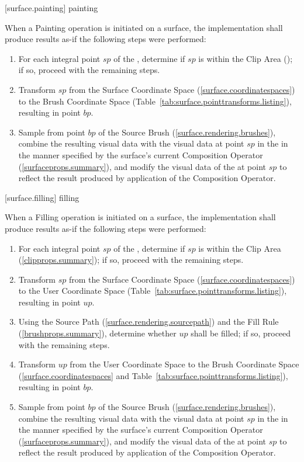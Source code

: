  [surface.painting] { painting}

\pnum
When a Painting operation is initiated on a surface, the implementation shall produce results as-if the following steps were performed:

\begin{enumerate}
\item For each integral point $sp$ of the \underlyingsurface, determine if $sp$ is within the Clip Area (); if so, proceed with the remaining steps.
\item Transform $sp$ from the Surface Coordinate Space (\ref{surface.coordinatespaces}) to the Brush Coordinate Space (Table~\ref{tab:surface.pointtransforms.listing}), resulting in point $bp$.
\item Sample from point $bp$ of the Source Brush (\ref{surface.rendering.brushes}), combine the resulting visual data with the visual data at point $sp$ in the \underlyingsurface in the manner specified by the surface's current Composition Operator (\ref{surfaceprops.summary}), and modify the visual data of the \underlyingsurface at point $sp$ to reflect the result produced by application of the Composition Operator.
\end{enumerate}

 [surface.filling] { filling}

\pnum
When a Filling operation is initiated on a surface, the implementation shall produce results as-if the following steps were performed:

\begin{enumerate}
\item For each integral point $sp$ of the \underlyingsurface, determine if $sp$ is within the Clip Area (\ref{clipprops.summary}); if so, proceed with the remaining steps.
\item Transform $sp$ from the Surface Coordinate Space (\ref{surface.coordinatespaces}) to the User Coordinate Space (Table~\ref{tab:surface.pointtransforms.listing}), resulting in point $up$.
\item Using the Source Path (\ref{surface.rendering.sourcepath}) and the Fill Rule (\ref{brushprops.summary}), determine whether $up$ shall be filled; if so, proceed with the remaining steps.
\item Transform $up$ from the User Coordinate Space to the Brush Coordinate Space (\ref{surface.coordinatespaces} and Table~\ref{tab:surface.pointtransforms.listing}), resulting in point $bp$.
\item Sample from point $bp$ of the Source Brush (\ref{surface.rendering.brushes}), combine the resulting visual data with the visual data at point $sp$ in the \underlyingsurface in the manner specified by the surface's current Composition Operator (\ref{surfaceprops.summary}), and modify the visual data of the \underlyingsurface at point $sp$ to reflect the result produced by application of the Composition Operator.
\end{enumerate}

